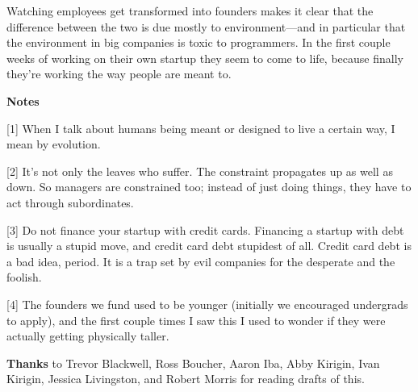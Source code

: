 Watching
                    employees get transformed into founders makes it clear that
                    the difference between the two is due mostly to
                    environment---and in particular that the environment in
                    big companies is toxic to programmers. In the first couple
                    weeks of working on their own startup they seem to come to
                    life, because finally they're working the way people are
                    meant to.





\textbf{Notes}

[1] When I talk about humans being meant or designed to live
                    a certain way, I mean by evolution.

[2] It's not only the leaves who suffer. The constraint
                    propagates up as well as down. So managers are constrained
                    too; instead of just doing things, they have to act through
                    subordinates.

[3] Do not finance your startup with credit cards. Financing
                    a startup with debt is usually a stupid move, and credit
                    card debt stupidest of all. Credit card debt is a bad idea,
                    period. It is a trap set by evil companies for the desperate
                    and the foolish.

[4] The founders we fund used to be younger (initially we
                    encouraged undergrads to apply), and the first couple times
                    I saw this I used to wonder if they were actually getting
                    physically taller.

\textbf{Thanks} to Trevor
                    Blackwell, Ross Boucher, Aaron Iba, Abby Kirigin, Ivan
                    Kirigin, Jessica Livingston, and Robert Morris for reading
                    drafts of this.




              
            
          
